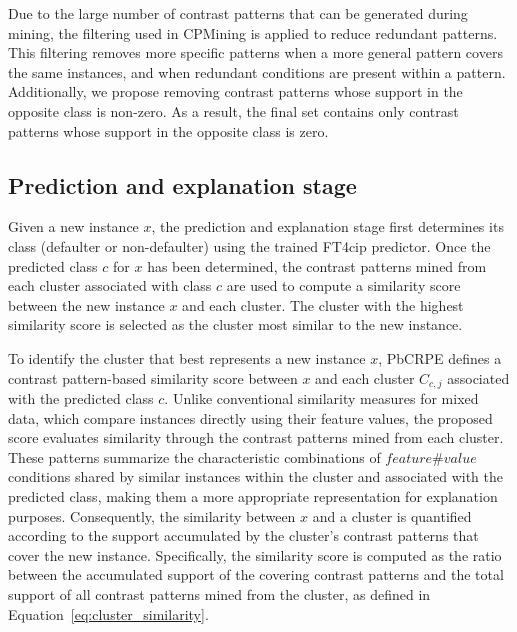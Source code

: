 		Due to the large number of contrast patterns that can be generated during mining, the filtering used in CPMining is applied to reduce redundant patterns. This filtering removes more specific patterns when a more general pattern covers the same instances, and when redundant conditions are present within a pattern. Additionally, we propose removing contrast patterns whose support in the opposite class is non-zero. As a result, the final set contains only contrast patterns whose support in the opposite class is zero.
		
       \subsection{Prediction and explanation stage}
       
       Given a new instance $x$, the prediction and explanation stage first determines its class (defaulter or non-defaulter) using the trained FT4cip predictor. Once the predicted class $c$ for $x$ has been determined, the contrast patterns mined from each cluster associated with class $c$ are used to compute a similarity score between the new instance $x$ and each cluster. The cluster with the highest similarity score is selected as the cluster most similar to the new instance. \newline %
       
       To identify the cluster that best represents a new instance $x$, PbCRPE defines a contrast pattern-based similarity score between $x$ and each cluster $C_{c,j}$ associated with the predicted class $c$. Unlike conventional similarity measures for mixed data, which compare instances directly using their feature values, the proposed score evaluates similarity through the contrast patterns mined from each cluster. These patterns summarize the characteristic combinations of $feature\#value$ conditions shared by similar instances within the cluster and associated with the predicted class, making them a more appropriate representation for explanation purposes. Consequently, the similarity between $x$ and a cluster is quantified according to the support accumulated by the cluster's contrast patterns that cover the new instance. Specifically, the similarity score is computed as the ratio between the accumulated support of the covering contrast patterns and the total support of all contrast patterns mined from the cluster, as defined in Equation~\ref{eq:cluster_similarity}.\newline
             

